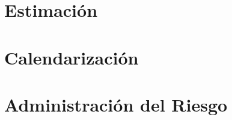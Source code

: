 \minitoc
\section{Estimación}\label{sec:estimacion}


\section{Calendarización}
\label{sec:calendarizacion}


\section{Administración del Riesgo}
\label{sec:riesgos}

